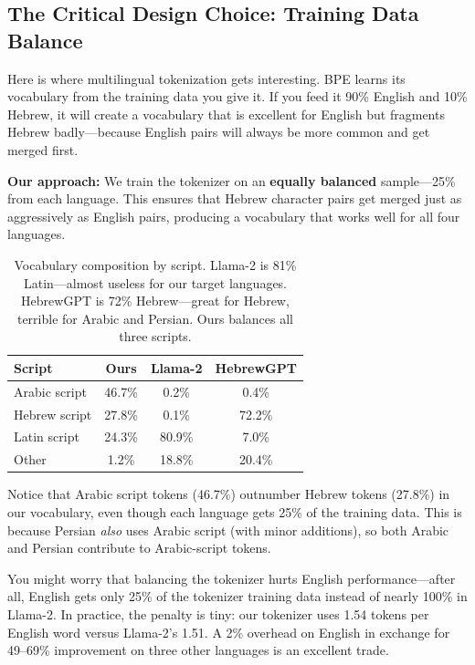 \documentclass[11pt,a4paper]{article}
\begin{document}
\subsection{The Critical Design Choice: Training Data Balance}

Here is where multilingual tokenization gets interesting. BPE learns its vocabulary from the training data you give it. If you feed it 90\% English and 10\% Hebrew, it will create a vocabulary that is excellent for English but fragments Hebrew badly---because English pairs will always be more common and get merged first.

\textbf{Our approach:} We train the tokenizer on an \textbf{equally balanced} sample---25\% from each language. This ensures that Hebrew character pairs get merged just as aggressively as English pairs, producing a vocabulary that works well for all four languages.

\begin{table}[H]
\centering
\begin{tabular}{lccc}
\toprule
\textbf{Script} & \textbf{Ours} & \textbf{Llama-2} & \textbf{HebrewGPT} \\
\midrule
Arabic script & 46.7\% & 0.2\% & 0.4\% \\
Hebrew script & 27.8\% & 0.1\% & 72.2\% \\
Latin script & 24.3\% & 80.9\% & 7.0\% \\
Other & 1.2\% & 18.8\% & 20.4\% \\
\bottomrule
\end{tabular}
\caption{Vocabulary composition by script. Llama-2 is 81\% Latin---almost useless for our target languages. HebrewGPT is 72\% Hebrew---great for Hebrew, terrible for Arabic and Persian. Ours balances all three scripts.}
\label{tab:vocab_composition}
\end{table}

Notice that Arabic script tokens (46.7\%) outnumber Hebrew tokens (27.8\%) in our vocabulary, even though each language gets 25\% of the training data. This is because Persian \emph{also} uses Arabic script (with minor additions), so both Arabic and Persian contribute to Arabic-script tokens.

\begin{warning}
You might worry that balancing the tokenizer hurts English performance---after all, English gets only 25\% of the tokenizer training data instead of nearly 100\% in Llama-2. In practice, the penalty is tiny: our tokenizer uses 1.54 tokens per English word versus Llama-2's 1.51. A 2\% overhead on English in exchange for 49--69\% improvement on three other languages is an excellent trade.
\end{warning}
\end{document}
